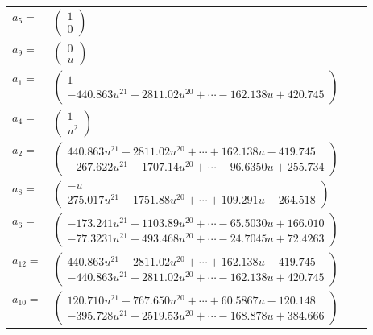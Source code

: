 \documentclass[1p]{elsarticle_modified}
\theoremstyle{definition}
\begin{document}
\begin{tabular}{m{7pt} m{180pt} m{7pt} m{180pt} }
\flushright $a_{5}=$&$\begin{pmatrix}1\\0\end{pmatrix}$ \\
\flushright $a_{9}=$&$\begin{pmatrix}0\\u\end{pmatrix}$ \\
\flushright $a_{1}=$&$\begin{pmatrix}1\\-440.863 u^{21}+2811.02 u^{20}+\cdots-162.138 u+420.745\end{pmatrix}$ \\
\flushright $a_{4}=$&$\begin{pmatrix}1\\u^2\end{pmatrix}$ \\
\flushright $a_{2}=$&$\begin{pmatrix}440.863 u^{21}-2811.02 u^{20}+\cdots+162.138 u-419.745\\-267.622 u^{21}+1707.14 u^{20}+\cdots-96.6350 u+255.734\end{pmatrix}$ \\
\flushright $a_{8}=$&$\begin{pmatrix}- u\\275.017 u^{21}-1751.88 u^{20}+\cdots+109.291 u-264.518\end{pmatrix}$ \\
\flushright $a_{6}=$&$\begin{pmatrix}-173.241 u^{21}+1103.89 u^{20}+\cdots-65.5030 u+166.010\\-77.3231 u^{21}+493.468 u^{20}+\cdots-24.7045 u+72.4263\end{pmatrix}$ \\
\flushright $a_{12}=$&$\begin{pmatrix}440.863 u^{21}-2811.02 u^{20}+\cdots+162.138 u-419.745\\-440.863 u^{21}+2811.02 u^{20}+\cdots-162.138 u+420.745\end{pmatrix}$ \\
\flushright $a_{10}=$&$\begin{pmatrix}120.710 u^{21}-767.650 u^{20}+\cdots+60.5867 u-120.148\\-395.728 u^{21}+2519.53 u^{20}+\cdots-168.878 u+384.666\end{pmatrix}$ \\

\end{tabular}
\end{document}
